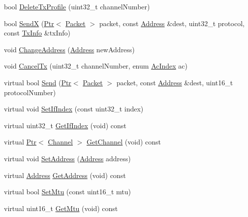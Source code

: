 \begin{DoxyCompactItemize}
\item 
bool \hyperlink{classns3_1_1WaveNetDevice_a1bedf1420a065a47bea96590b4004be5}{Delete\+Tx\+Profile} (uint32\+\_\+t channel\+Number)
\item 
bool \hyperlink{classns3_1_1WaveNetDevice_a99ec2b781006c6011a9667e064843b38}{SendX} (\hyperlink{classns3_1_1Ptr}{Ptr}$<$ \hyperlink{classns3_1_1Packet}{Packet} $>$ packet, const \hyperlink{classns3_1_1Address}{Address} \&dest, uint32\+\_\+t protocol, const \hyperlink{structns3_1_1TxInfo}{Tx\+Info} \&tx\+Info)
\item 
void \hyperlink{classns3_1_1WaveNetDevice_a15ea0879945399632f422f41cf9e18cc}{Change\+Address} (\hyperlink{classns3_1_1Address}{Address} new\+Address)
\item 
void \hyperlink{classns3_1_1WaveNetDevice_acba936255c24bbfb833b904a80cf5595}{Cancel\+Tx} (uint32\+\_\+t channel\+Number, enum \hyperlink{group__wifi_gab422b4562ba272b39a9b6bca3513f3ac}{Ac\+Index} ac)
\item 
virtual bool \hyperlink{classns3_1_1WaveNetDevice_a21f1928cbc917375a79cb6ed48f4db3e}{Send} (\hyperlink{classns3_1_1Ptr}{Ptr}$<$ \hyperlink{classns3_1_1Packet}{Packet} $>$ packet, const \hyperlink{classns3_1_1Address}{Address} \&dest, uint16\+\_\+t protocol\+Number)
\item 
virtual void \hyperlink{classns3_1_1WaveNetDevice_ac6d2149989047dde63c914c1425fb26b}{Set\+If\+Index} (const uint32\+\_\+t index)
\item 
virtual uint32\+\_\+t \hyperlink{classns3_1_1WaveNetDevice_a049bbb84ab271ea4663c0f7515132cc0}{Get\+If\+Index} (void) const 
\item 
virtual \hyperlink{classns3_1_1Ptr}{Ptr}$<$ \hyperlink{classns3_1_1Channel}{Channel} $>$ \hyperlink{classns3_1_1WaveNetDevice_a887be3c7138671e2fc3e2caff96ce3dc}{Get\+Channel} (void) const 
\item 
virtual void \hyperlink{classns3_1_1WaveNetDevice_af398bddb4768c86bdd1cb37ca1963eca}{Set\+Address} (\hyperlink{classns3_1_1Address}{Address} address)
\item 
virtual \hyperlink{classns3_1_1Address}{Address} \hyperlink{classns3_1_1WaveNetDevice_a26fc24872a196373d69b21615514a758}{Get\+Address} (void) const 
\item 
virtual bool \hyperlink{classns3_1_1WaveNetDevice_a382714bf5a869123c1a38f5c4a0c7a06}{Set\+Mtu} (const uint16\+\_\+t mtu)
\item 
virtual uint16\+\_\+t \hyperlink{classns3_1_1WaveNetDevice_a827dd0721ba254bf2112c8f2642f9a23}{Get\+Mtu} (void) const 

\end{DoxyCompactItemize}
